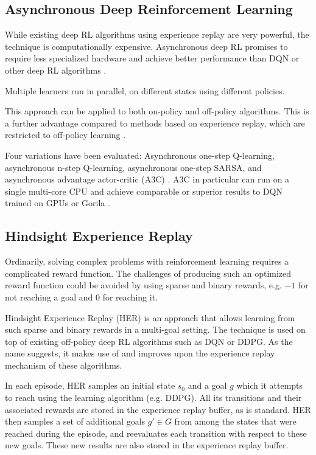 \documentclass[runningheads]{llncs}
\begin{document}
\subsection{Asynchronous Deep Reinforcement Learning}

While existing deep RL algorithms using experience replay are very powerful, the technique is computationally expensive. Asynchronous deep RL promises to require less specialized hardware and achieve better performance than DQN or other deep RL algorithms \cite{mnih2016asynchronous}.

Multiple learners run in parallel, on different states using different policies.

This approach can be applied to both on-policy and off-policy algorithms. This is a further advantage compared to methods based on experience replay, which are restricted to off-policy learning \cite{mnih2016asynchronous}.

Four variations have been evaluated: Asynchronous one-step Q-learning, asynchronous n-step Q-learning, asynchronous one-step SARSA, and asynchronous advantage actor-critic (A3C) \cite{mnih2016asynchronous}. A3C in particular can run on a single multi-core CPU and achieve comparable or superior results to DQN trained on GPUs or Gorila \cite{mnih2016asynchronous}.

\subsection{Hindsight Experience Replay}

Ordinarily, solving complex problems with reinforcement learning requires a complicated reward function.  The challenges of producing such an optimized reward function could be avoided by using sparse and binary rewards, e.g. $-1$ for not reaching a goal and $0$ for reaching it.

Hindsight Experience Replay (HER) \cite{andrychowicz2017hindsight} is an approach that allows learning from such sparse and binary rewards in a multi-goal setting. The technique is used on top of existing off-policy deep RL algorithms such as DQN or DDPG. As the name suggests, it makes use of and improves upon the experience replay mechanism of these algorithms.

In each episode, HER samples an initial state $s_0$ and a goal $g$ which it attempts to reach using the learning algorithm (e.g. DDPG). All its transitions and their associated rewards are stored in the experience replay buffer, as is standard. HER then samples a set of additional goals $g' \in G$ from among the states that were reached during the episode, and reevaluates each transition with respect to these new goals. These new results are also stored in the experience replay buffer.
\end{document}

